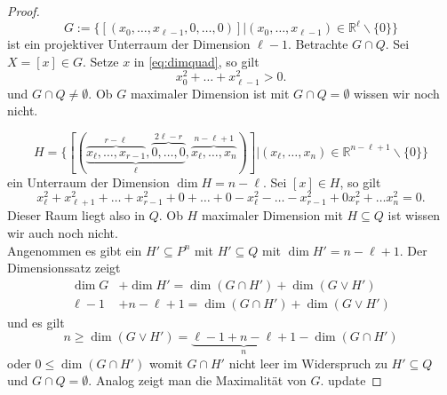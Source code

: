 \documentclass[11pt]{article}
\begin{document}
\begin{proof}
\begin{equation*}
    G:= \{[(x_0,\dots, x_{\ell-1}, 0,\dots,0)]|(x_0,\dots, x_{\ell-1})\in \mathbb R^{\ell}\backslash\{0\}\}
\end{equation*} ist ein projektiver Unterraum der Dimension $\ell-1$. Betrachte $G\cap Q$. Sei $X= [x]\in G$. Setze $x$ in \eqref{eq:dimquad}, so gilt 
\begin{equation*}
     x_0^2 + \dots + x_{\ell-1}^2 > 0.
\end{equation*} und $G\cap Q\neq \emptyset$. Ob $G$ maximaler Dimension ist mit $G\cap Q = \emptyset$ wissen wir noch nicht.

\begin{equation*}
    H= \{[(\underbrace{\overbrace{x_\ell,\dots, x_{r-1}}^{r-\ell},\overbrace{ 0 ,\dots, 0}^{2\ell-r}}_{\ell}, \overbrace{x_\ell,\dots, x_n}^{n-\ell +1})]| (x_\ell, \dots, x_n) \in \mathbb R^{n-\ell+1}\backslash \{0\}\}
\end{equation*} ein Unterraum der Dimension $\dim H = n-\ell$. Sei $[x]\in H$, so gilt \begin{equation*}
    x_\ell^2 + x_{\ell+1}^2 + \dots + x_{r-1}^2 + 0 + \dots  + 0 - x_\ell^2 - \dots - x_{r-1}^2 + 0 x_r^2 + \dots x_n^2 = 0.
\end{equation*}
Dieser Raum liegt also in $Q$. Ob $H$ maximaler Dimension mit $H\subseteq Q$ ist wissen wir auch noch nicht.\\
Angenommen es gibt ein $H'\subseteq P^n$ mit $H'\subseteq Q$ mit $\dim H' = n-\ell + 1$. Der Dimensionssatz zeigt \begin{equation*}
\begin{split}
    \dim G &+ \dim H' = \dim (G\cap H') + \dim (G\lor H')\\
    \ell-1 &+n-\ell + 1  =  \dim (G\cap H') + \dim (G\lor H')
\end{split}
\end{equation*}
 und es gilt \begin{equation*}
     n\geq \dim(G\lor H') = \underbrace{\ell-1+n-\ell + 1}_n - \dim(G\cap H')
 \end{equation*}
 oder $0\leq \dim(G\cap H')$ womit $G\cap H'$ nicht leer im Widerspruch zu $H'\subseteq Q$ und $G\cap Q = \emptyset$. Analog zeigt man die Maximalität von $G$. update
\end{proof}
\end{document}
